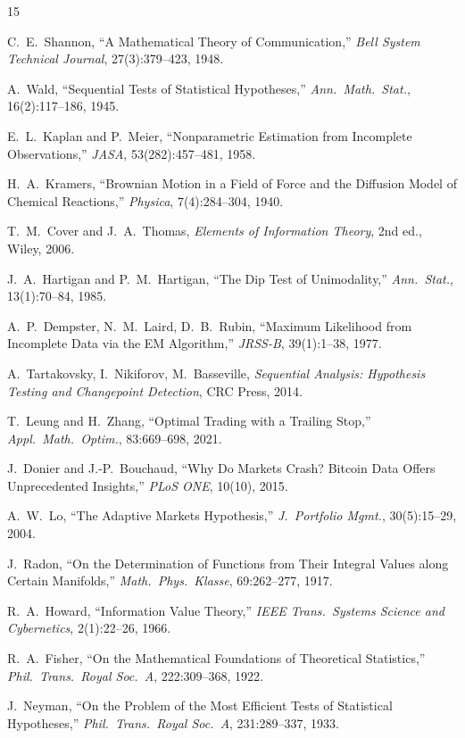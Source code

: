 \documentclass[11pt,a4paper]{article}
\begin{document}
\begin{thebibliography}{15}

 C.~E.~Shannon, ``A Mathematical Theory of Communication,'' \textit{Bell System Technical Journal}, 27(3):379--423, 1948.

 A.~Wald, ``Sequential Tests of Statistical Hypotheses,'' \textit{Ann.\ Math.\ Stat.}, 16(2):117--186, 1945.

 E.~L.~Kaplan and P.~Meier, ``Nonparametric Estimation from Incomplete Observations,'' \textit{JASA}, 53(282):457--481, 1958.

 H.~A.~Kramers, ``Brownian Motion in a Field of Force and the Diffusion Model of Chemical Reactions,'' \textit{Physica}, 7(4):284--304, 1940.

 T.~M.~Cover and J.~A.~Thomas, \textit{Elements of Information Theory}, 2nd ed., Wiley, 2006.

 J.~A.~Hartigan and P.~M.~Hartigan, ``The Dip Test of Unimodality,'' \textit{Ann.\ Stat.}, 13(1):70--84, 1985.

 A.~P.~Dempster, N.~M.~Laird, D.~B.~Rubin, ``Maximum Likelihood from Incomplete Data via the EM Algorithm,'' \textit{JRSS-B}, 39(1):1--38, 1977.

 A.~Tartakovsky, I.~Nikiforov, M.~Basseville, \textit{Sequential Analysis: Hypothesis Testing and Changepoint Detection}, CRC Press, 2014.

 T.~Leung and H.~Zhang, ``Optimal Trading with a Trailing Stop,'' \textit{Appl.\ Math.\ Optim.}, 83:669--698, 2021.

 J.~Donier and J.-P.~Bouchaud, ``Why Do Markets Crash? Bitcoin Data Offers Unprecedented Insights,'' \textit{PLoS ONE}, 10(10), 2015.

 A.~W.~Lo, ``The Adaptive Markets Hypothesis,'' \textit{J.\ Portfolio Mgmt.}, 30(5):15--29, 2004.

 J.~Radon, ``On the Determination of Functions from Their Integral Values along Certain Manifolds,'' \textit{Math.\ Phys.\ Klasse}, 69:262--277, 1917.

 R.~A.~Howard, ``Information Value Theory,'' \textit{IEEE Trans.\ Systems Science and Cybernetics}, 2(1):22--26, 1966.

 R.~A.~Fisher, ``On the Mathematical Foundations of Theoretical Statistics,'' \textit{Phil.\ Trans.\ Royal Soc.\ A}, 222:309--368, 1922.

 J.~Neyman, ``On the Problem of the Most Efficient Tests of Statistical Hypotheses,'' \textit{Phil.\ Trans.\ Royal Soc.\ A}, 231:289--337, 1933.

\end{thebibliography}
\end{document}
